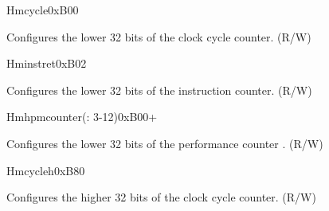 \begin{register}{H}{mcycle}{0xB00}\label{regdesc:LPMCYCLE}
%
\regnewline%
\begin{regdesc}\begin{reglist}
\label{fielddesc:LPMCYCLE}\item [MCYCLE] Configures the lower 32 bits of the clock cycle counter. (R/W)
\end{reglist}\end{regdesc}
\end{register}

\begin{register}{H}{minstret}{0xB02}\label{regdesc:LPMINSTRET}
%
\regnewline%
\begin{regdesc}\begin{reglist}
\label{fielddesc:LPMINSTRET}\item [MINSTRET] Configures the lower 32 bits of the instruction counter. (R/W)
\end{reglist}\end{regdesc}
\end{register}


\begin{register}{H}{mhpmcounter(: 3-12)}{0xB00+}\label{regdesc:LPMHPMCOUNTER}
%
\regnewline%
\begin{regdesc}\begin{reglist}
\label{fielddesc:LPMHMPCOUNTER}\item [MHPMCOUNTER\regindex{n}] Configures the lower 32 bits of the performance counter . (R/W)
\end{reglist}\end{regdesc}
\end{register}


\begin{register}{H}{mcycleh}{0xB80}\label{regdesc:LPMCYCLEH}
%
\regnewline%
\begin{regdesc}\begin{reglist}
\label{fielddesc:LPMCYCLEH}\item [MCYCLEH] Configures the higher 32 bits of the clock cycle counter. (R/W)
\end{reglist}\end{regdesc}
\end{register}

